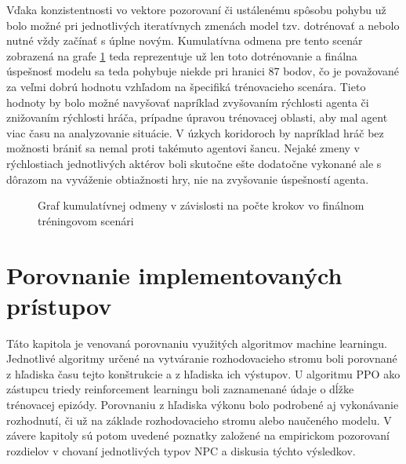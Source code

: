 \documentclass[slovak, master]{diploma}
\begin{document}
Vďaka konzistentnosti vo vektore pozorovaní či ustálenému spôsobu pohybu už bolo možné pri jednotlivých iteratívnych zmenách model tzv. dotrénovať a nebolo nutné vždy začínať s úplne novým. Kumulatívna odmena pre tento scenár zobrazená na grafe \ref{plt:finalScenario} teda reprezentuje už len toto dotrénovanie a finálna úspešnosť modelu sa teda pohybuje niekde pri hranici 87 bodov, čo je považované za veľmi dobrú hodnotu vzhľadom na špecifiká trénovacieho scenára. Tieto hodnoty by bolo možné navyšovať napríklad zvyšovaním rýchlosti agenta či znižovaním rýchlosti hráča, prípadne úpravou trénovacej oblasti, aby mal agent viac času na analyzovanie situácie. V úzkych koridoroch by napríklad hráč bez možnosti brániť sa nemal proti takémuto agentovi šancu. Nejaké zmeny v rýchlostiach jednotlivých aktérov boli skutočne ešte dodatočne vykonané ale s dôrazom na vyváženie obtiažnosti hry, nie na zvyšovanie úspešností agenta. 
\begin{figure}[!htbp]
    \centering
    \caption{Graf kumulatívnej odmeny v závislosti na počte krokov vo finálnom tréningovom scenári}
    \label{plt:finalScenario}
\end{figure}


\chapter{Porovnanie implementovaných prístupov}
\label{sec:Compare}
Táto kapitola je venovaná porovnaniu využitých algoritmov machine learningu. Jednotlivé algoritmy určené na vytváranie rozhodovacieho stromu boli porovnané z hľadiska času tejto konštrukcie a z hľadiska ich výstupov. U algoritmu PPO ako zástupcu triedy reinforcement learningu boli zaznamenané údaje o dĺžke trénovacej epizódy. Porovnaniu z hľadiska výkonu bolo podrobené aj vykonávanie rozhodnutí, či už na základe rozhodovacieho stromu alebo naučeného modelu. V závere kapitoly sú potom uvedené poznatky založené na empirickom pozorovaní rozdielov v chovaní jednotlivých typov NPC a diskusia týchto výsledkov.
\end{document}
